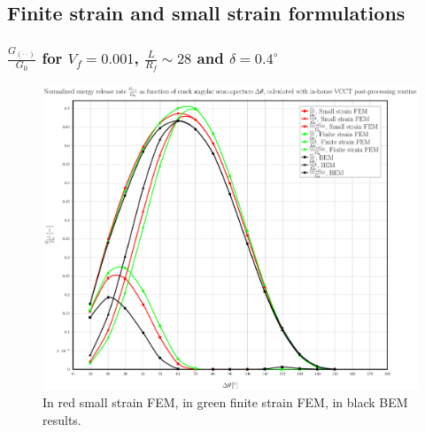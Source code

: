 \documentclass[first,firstsupp,lastsupp,handout,last,hyperref,table]{ETHclass}
\begin{document}
\subsection{Finite strain and small strain formulations}

\begin{frame}
\frametitle{\small $\frac{G_{\left(\cdot\cdot\right)}}{G_{0}}$ for $V_{f}=0.001$, $\frac{L}{R_{f}}\sim28$ and $\delta=0.4^{\circ}$}
\vspace{-0.5cm}
\centering
\captionsetup[figure]{font=scriptsize,labelfont=scriptsize}
\begin{figure}[!h]
\centering
\includegraphics[height=0.7\textheight]{2017-06-23_AbqRunSummary_SingleFiberEqRfSmallFiniteStrain_M-VCCT_Summary.pdf}
  \caption{\scriptsize In red small strain FEM, in green finite strain FEM, in black BEM results.}
  \label{fig:res1}
\end{figure}
\end{frame}
\end{document}
